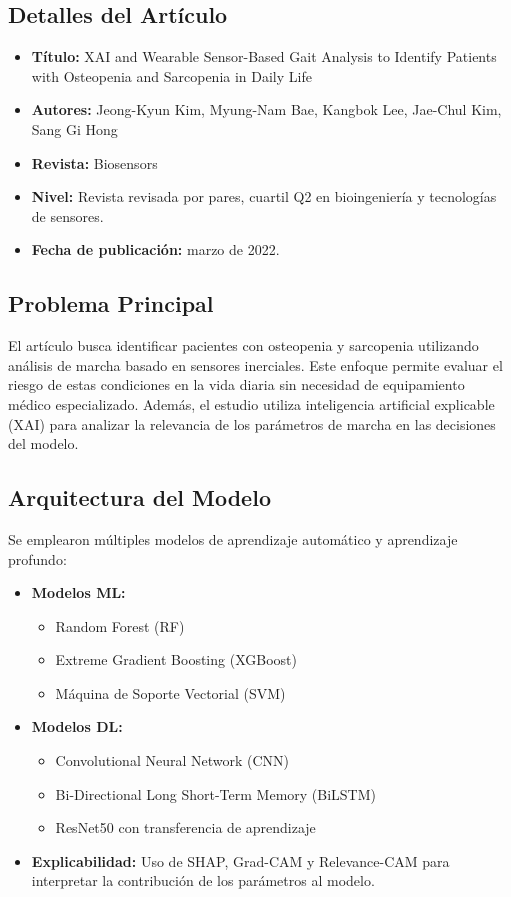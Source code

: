 \documentclass{report}
\begin{document}
\subsection{Detalles del Artículo}
\begin{itemize}
    \item \textbf{Título:} XAI and Wearable Sensor-Based Gait Analysis to Identify Patients with Osteopenia and Sarcopenia in Daily Life
    \item \textbf{Autores:} Jeong-Kyun Kim, Myung-Nam Bae, Kangbok Lee, Jae-Chul Kim, Sang Gi Hong
    \item \textbf{Revista:} Biosensors
    \item \textbf{Nivel:} Revista revisada por pares, cuartil Q2 en bioingeniería y tecnologías de sensores.
    \item \textbf{Fecha de publicación:} marzo de 2022.
\end{itemize}

\subsection{Problema Principal}
El artículo busca identificar pacientes con osteopenia y sarcopenia utilizando análisis de marcha basado en sensores inerciales. Este enfoque permite evaluar el riesgo de estas condiciones en la vida diaria sin necesidad de equipamiento médico especializado. Además, el estudio utiliza inteligencia artificial explicable (XAI) para analizar la relevancia de los parámetros de marcha en las decisiones del modelo.

\subsection{Arquitectura del Modelo}
Se emplearon múltiples modelos de aprendizaje automático y aprendizaje profundo:
\begin{itemize}
    \item \textbf{Modelos ML:}
    \begin{itemize}
        \item Random Forest (RF)
        \item Extreme Gradient Boosting (XGBoost)
        \item Máquina de Soporte Vectorial (SVM)
    \end{itemize}
    \item \textbf{Modelos DL:}
    \begin{itemize}
        \item Convolutional Neural Network (CNN)
        \item Bi-Directional Long Short-Term Memory (BiLSTM)
        \item ResNet50 con transferencia de aprendizaje
    \end{itemize}
    \item \textbf{Explicabilidad:} Uso de SHAP, Grad-CAM y Relevance-CAM para interpretar la contribución de los parámetros al modelo.
\end{itemize}
\end{document}
